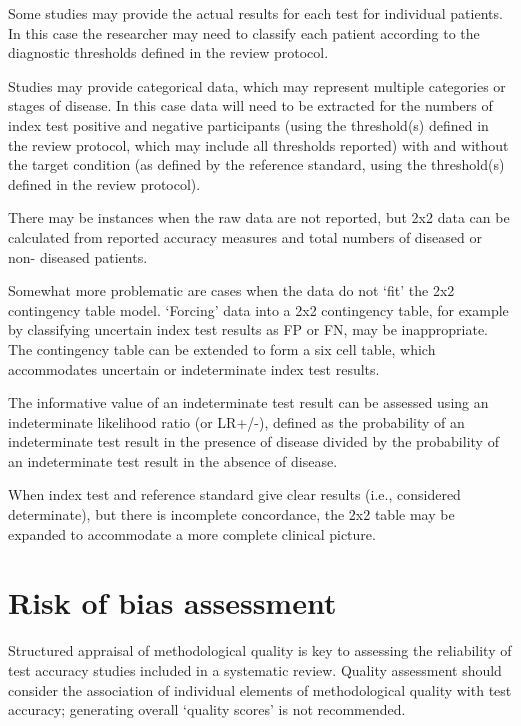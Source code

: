 \documentclass[
  10pt,
  a4paper,
  DIV=11,
  numbers=noendperiod]{scrreprt}
\begin{document}
Some studies may provide the actual results for each test for individual
patients. In this case the researcher may need to classify each patient
according to the diagnostic thresholds defined in the review protocol.

Studies may provide categorical data, which may represent multiple
categories or stages of disease. In this case data will need to be
extracted for the numbers of index test positive and negative
participants (using the threshold(s) defined in the review protocol,
which may include all thresholds reported) with and without the target
condition (as defined by the reference standard, using the threshold(s)
defined in the review protocol).

There may be instances when the raw data are not reported, but 2x2 data
can be calculated from reported accuracy measures and total numbers of
diseased or non- diseased patients.

Somewhat more problematic are cases when the data do not `fit' the 2x2
contingency table model. `Forcing' data into a 2x2 contingency table,
for example by classifying uncertain index test results as FP or FN, may
be inappropriate. The contingency table can be extended to form a six
cell table, which accommodates uncertain or indeterminate index test
results.

The informative value of an indeterminate test result can be assessed
using an indeterminate likelihood ratio (or LR+/-), defined as the
probability of an indeterminate test result in the presence of disease
divided by the probability of an indeterminate test result in the
absence of disease.

When index test and reference standard give clear results (i.e.,
considered determinate), but there is incomplete concordance, the 2x2
table may be expanded to accommodate a more complete clinical picture.

\section{Risk of bias assessment}\label{risk-of-bias-assessment-2}

Structured appraisal of methodological quality is key to assessing the
reliability of test accuracy studies included in a systematic review.
Quality assessment should consider the association of individual
elements of methodological quality with test accuracy; generating
overall `quality scores' is not recommended.
\end{document}
